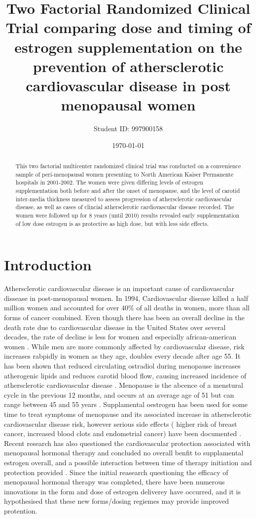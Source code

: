 \documentclass[11pt]{article}
\title{Two Factorial Randomized Clinical Trial comparing dose and timing of estrogen supplementation on the prevention of athersclerotic cardiovascular disease in post menopausal women}
\author{Student ID: 997900158}
\date{\today}
\begin{document}
	\maketitle
	\begin{abstract}
		This two factorial multicenter randomized clinical trial was conducted on a convenience sample of peri-menopausal women presenting to North American Kaiser Permanente hospitals in 2001-2002.
		The women were given differing levels of estrogen supplementation both before and after the onset of menopause, and the level of carotid inter-media thickness measured to assess progression of athersclerotic cardiovascular disease, as well as cases of clincial athersclerotic cardiovascular disease recorded.
		The women were followed up for 8 years (until 2010) results revealed early supplementation of low dose estrogen is as protective as high dose, but with less side effects.

	\end{abstract}

\onehalfspace
	\section{Introduction} 
		Athersclerotic cardiovascular disease is an important cause of cardiovascular dissease in post-menopausal women.
		In 1994, Cardiovascular disease killed a half million women and accounted for over 40\% of all deaths in women, more than all forms of cancer combined\cite{AHA1997}.
		Even though there has been an overall decline in the death rate due to cardiovascular disease in the United States over several decades, the rate of decline is less for women and especially african-american women \cite{Mosca1997}.
		While men are more commonly affected by cardiovascular disease, risk increases rabpidly in women as they age, doubles every decade after age 55\cite{Gordon1978}. 
		It has been shown that reduced circulating ostradiol during menopause increases atherogenic lipids and reduces carotid blood flow, causing increased incidence of athersclerotic cardiovascular disease \cite{Hodis}.
		Menopause is the abcence of a menstural cycle in the previous 12 months, and occurs at an average age of 51 but can range between 45 and 55 years \cite{Gold2012}. 
		Supplamental oestrogen has been used for some time to treat symptoms of menopause and its associated increase in athersclerotic cardiovascular disease risk, however serious side effects ( higher risk of breast cancer, increased blood clots and endometrial cancer) have been documented \cite{Gold2012}.
		Recent research has also questioned the cardiovascular protection associated with menopausal hormonal therapy and concluded no overall benfit to supplamental estrogen overall, and a possible interaction between time of therapy initiation and protection provided \cite{Anderson2004,Prentice2009}.
		Since the initial reasearch questioning the efficacy of menopausal hormonal therapy was completed, there have been numerous innovations in the form and dose of estrogen deliverey have occurred, and it is hypothesised that these new forms/dosing regiemes may provide improved protention.
\end{document}
